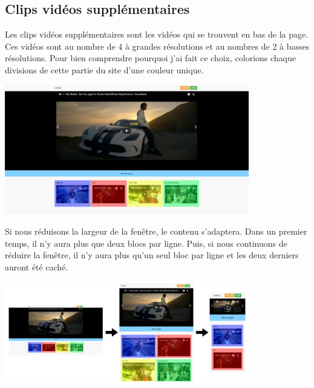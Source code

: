 \documentclass{article}
\begin{document}
\subsection{Clips vid\'eos suppl\'ementaires}

Les clips vid\'eos suppl\'ementaires sont les vid\'eos qui se trouvent en bas de la page. Ces vid\'eos sont au nombre de 4 \`a grandes r\'esolutions et au nombres de 2 \`a basses r\'esolutions. Pour bien comprendre pourquoi j'ai fait ce choix, colorions chaque divisions de cette partie du site d'une couleur unique.
\begin{center}
\vspace{0.5cm}
\includegraphics[width=0.8\textwidth]{pc4}
\vspace{0.5cm}
\end{center}

Si nous r\'eduisons la largeur de la fen\^etre, le contenu s'adaptera. Dans un premier temps, il n'y aura plus que deux blocs par ligne. Puis, si nous continuons de r\'eduire la fen\^etre, il n'y aura plus qu'un seul bloc par ligne et les deux derniers auront \'et\'e cach\'e.
\begin{center}
\vspace{0.5cm}
\includegraphics[width=0.8\textwidth]{pc7}
\vspace{0.5cm}\\
\end{center}
\end{document}
